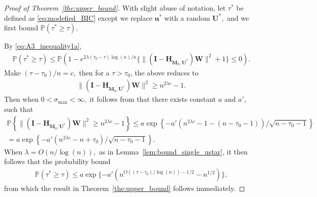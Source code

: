 \documentclass[12pt]{article}
\theoremstyle{shortspace}
\def\*#1{\bm{#1}}
\def\P{\mathbb P}
\begin{document}
\begin{proof}[Proof of Theorem~\ref{the:upper_bound}]
With slight abuse of notation, let $\tau^*$ be defined as \eqref{eq:modefied_BIC} except we replace $\*u^*$ with a random $\*U^*,$ and we first bound $\P(\tau^* \geq \tau ).$

By \ref{eq:A3_inequality1a},   
\begin{align*}
     \P(\tau^* \geq \tau) \leq \P(1  - e^{2\lambda(\tau_0-\tau)\log(n)/n} \{\|(\*I - \*H_{\*M_0, \*U^*}) \*W\|^2+1\} \leq 0).
\end{align*} 
Make $(\tau - \tau_0)/n = c,$ then for a $\tau > \tau_0$, the above reduces to 
\begin{align*}
  \|(\*I - \*H_{\*M_0, \*U^*}) \*W\|^2 \geq  n^{2\lambda c } -1 .
\end{align*}
Then when {$0  < \sigma_{\max} < \infty,$} it follows from \cite{vu2015random} that there exists constant $a$ and $a',$ such that 
\begin{align*}
     \P\left\{ \|(\*I - \*H_{\*M_0, \*U^*}) \*W\|^2 \geq n^{2\lambda c} - 1  \right\}  \leq a \exp\left\{-a' \left(n^{2\lambda c} -1  - (n - \tau_0 -1)\right) /\sqrt{n - \tau_0 -1}\right\}\\
      = a \exp\left\{-a' \left(n^{2\lambda c} - n + \tau_0\right) /\sqrt{n - \tau_0 -1}\right\}.
\end{align*}
When $\lambda  = O(n/\log(n)),$ as in Lemma~\ref{lem:bound_single_ustar}, it then follows that the probability bound 
\begin{align*}
     \P(\tau^* \geq \tau)  \leq a \exp\{-a'(n^{O((\tau-\tau_0)/\log(n)) -1/2} - n^{1/2})\},
\end{align*} 
from which the result in Theorem~\ref{the:upper_bound} 
follows immediately.


\end{proof}
\end{document}
